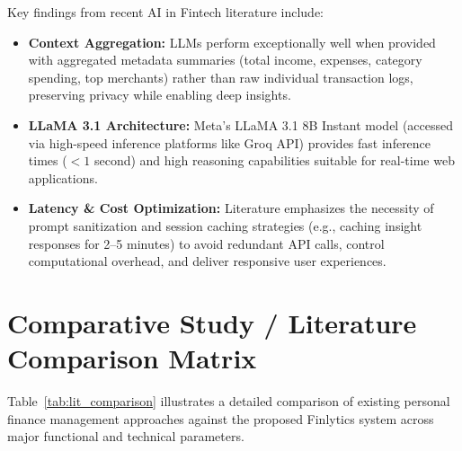 \documentclass[../Project-Report-Main.tex]{subfiles}
\begin{document}
Key findings from recent AI in Fintech literature include:
\begin{itemize}
 \item \textbf{Context Aggregation:} LLMs perform exceptionally well when provided with aggregated metadata summaries (total income, expenses, category spending, top merchants) rather than raw individual transaction logs, preserving privacy while enabling deep insights.
 \item \textbf{LLaMA 3.1 Architecture:} Meta's LLaMA 3.1 8B Instant model (accessed via high-speed inference platforms like Groq API) provides fast inference times ($< 1$ second) and high reasoning capabilities suitable for real-time web applications.
 \item \textbf{Latency \& Cost Optimization:} Literature emphasizes the necessity of prompt sanitization and session caching strategies (e.g., caching insight responses for 2--5 minutes) to avoid redundant API calls, control computational overhead, and deliver responsive user experiences.
\end{itemize}

\section{Comparative Study / Literature Comparison Matrix}

Table~\ref{tab:lit_comparison} illustrates a detailed comparison of existing personal finance management approaches against the proposed Finlytics system across major functional and technical parameters.
\end{document}
